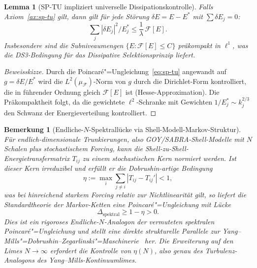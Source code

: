\documentclass[12pt,a4paper]{article}
\theoremstyle{breakdef}
\theoremstyle{breakplain}
\newtheorem{lemma}[definition]{Lemma}
\theoremstyle{breakdef}
\newtheorem{remark}[definition]{Bemerkung}
\begin{document}
\begin{lemma}[SP-TU impliziert universelle Dissipationskontrolle]\label{lem:sp-dissipation}
Falls Axiom~\ref{ax:sp-tu} gilt, dann gilt für jede Störung $\delta E = E - E^*$ mit $\sum \delta E_j = 0$:
\begin{equation}
  \sum_j |\delta E_j|^2 / E_j^* \leq \frac{1}{\lambda}\, \mathcal{F}[E].
\end{equation}
Insbesondere sind die Subniveaumengen $\{E : \mathcal{F}[E] \leq C\}$ präkompakt in $\ell^1$, was die DS3-Bedingung für das Dissipative Selektionsprinzip liefert.
\end{lemma}

\begin{proof}[Beweisskizze]
Durch die Poincaré"=Ungleichung~\eqref{eq:sp-tu} angewandt auf $g = \delta E / E^*$ wird die $L^2(\mu_{\mathcal{F}})$-Norm von $g$ durch die Dirichlet-Form kontrolliert, die in führender Ordnung gleich $\mathcal{F}[E]$ ist (Hesse-Approximation). Die Präkompaktheit folgt, da die gewichtete $\ell^2$-Schranke mit Gewichten $1/E_j^* \sim k_j^{2/3}$ den Schwanz der Energieverteilung kontrolliert.
\end{proof}

\begin{remark}[Endliche-$N$-Spektrallücke via Shell-Modell-Markov-Struktur]\label{rem:finite-N-gap}
Für endlich-dimensionale Trunkierungen, also GOY/SABRA-Shell-Modelle
mit $N$ Schalen plus stochastischem Forcing, kann die
Shell-zu-Shell-Energietransfermatrix $T_{ij}$ zu einem stochastischen
Kern normiert werden. Ist dieser Kern irreduzibel und erfüllt er die
Dobrushin-artige Bedingung
\[
  \eta := \max_i \sum_{j \neq i} |T_{ij} - T_{ij}'| < 1,
\]
was bei hinreichend starkem Forcing relativ zur Nichtlinearität gilt,
so liefert die Standardtheorie der Markov-Ketten eine
Poincaré"=Ungleichung mit Lücke
\[
  \Delta_{\mathrm{spektral}} \ge 1 - \eta > 0.
\]
Dies ist ein rigoroses Endliche-$N$-Analogon der vermuteten spektralen
Poincaré"=Ungleichung und stellt eine direkte strukturelle Parallele
zur Yang--Mills"=Dobrushin--Zegarlinski"=Maschinerie~\cite{Geiger2026-YM} her. Die Erweiterung auf den Limes $N \to \infty$
erfordert die Kontrolle von $\eta(N)$, also genau des
Turbulenz-Analogons des Yang--Mills-Kontinuumlimes.
\end{remark}
\end{document}
